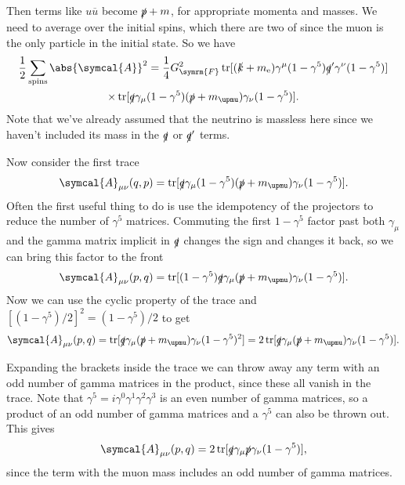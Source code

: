 \documentclass[fleqn]{NotesClass}
\newcommand{\Pparticle}[1]{\mathrm{#1}}
\newcommand{\Pex}{\ensuremath{\Pparticle{e}}}
\newcommand{\Pmux}{\ensuremath{\upmu}}
\newcommand{\diracadjoint}[1]{\overbar{#1}}
\newcommand{\amplitude}{\symcal{A}}
\DeclareMathOperator{\tr}{tr}
\newcommand{\fermiConst}{G_{\symrm{F}}}
\begin{document}
    Then terms like \(u\diracadjoint{u}\) become \(\slashed{p} + m\), for appropriate momenta and masses.
    We need to average over the initial spins, which there are two of since the muon is the only particle in the initial state.
    So we have
    \begin{multline}
        \frac{1}{2}\sum_{\text{spins}} \abs{\amplitude}^2 = \frac{1}{4}\fermiConst^2 \tr[(\slashed{k} + m_{\Pex})\gamma^\mu(1 - \gamma^5)\slashed{q}'\gamma^\nu(1 - \gamma^5)]\\
        \times \tr[\slashed{q}\gamma_\mu(1 - \gamma^5)(\slashed{p} + m_{\Pmux})\gamma_\nu(1 - \gamma^5)].
    \end{multline}
    Note that we've already assumed that the neutrino is massless here since we haven't included its mass in the \(\slashed{q}\) or \(\slashed{q}'\) terms.
    
    Now consider the first trace
    \begin{equation}
        \amplitude_{\mu\nu}(q, p) = \tr[\slashed{q}\gamma_\mu(1 - \gamma^5)(\slashed{p} + m_{\Pmux})\gamma_\nu(1 - \gamma^5)].
    \end{equation}
    Often the first useful thing to do is use the idempotency of the projectors to reduce the number of \(\gamma^5\) matrices.
    Commuting the first \(1 - \gamma^5\) factor past both \(\gamma_\mu\) and the gamma matrix implicit in \(\slashed{q}\) changes the sign and changes it back, so we can bring this factor to the front
    \begin{equation}
        \amplitude_{\mu\nu}(p, q) = \tr[(1 - \gamma^5)\slashed{q}\gamma_\mu(\slashed{p} + m_{\Pmux})\gamma_\nu(1 - \gamma^5)].
    \end{equation}
    Now we can use the cyclic property of the trace and \([(1 - \gamma^5)/2]^2 = (1 - \gamma^5)/2\) to get
    \begin{equation}
        \amplitude_{\mu\nu}(p, q) = \tr[\slashed{q}\gamma_\mu(\slashed{p} + m_{\Pmux})\gamma_\nu(1 - \gamma^5)^2] = 2\tr[\slashed{q}\gamma_\mu(\slashed{p} + m_{\Pmux})\gamma_\nu(1 - \gamma^5)].
    \end{equation}
    
    Expanding the brackets inside the trace we can throw away any term with an odd number of gamma matrices in the product, since these all vanish in the trace.
    Note that \(\gamma^5 = i\gamma^0\gamma^1\gamma^2\gamma^3\) is an even number of gamma matrices, so a product of an odd number of gamma matrices and a \(\gamma^5\) can also be thrown out.
    This gives
    \begin{equation}
        \amplitude_{\mu\nu}(p, q) = 2\tr[\slashed{q}\gamma_\mu\slashed{p}\gamma_\nu(1 - \gamma^5)],
    \end{equation}
    since the term with the muon mass includes an odd number of gamma matrices.
    
\end{document}
